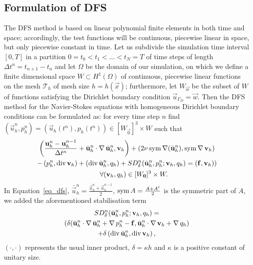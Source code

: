 \subsection{Formulation of DFS}
\label{sub_dfsFormulation}
The DFS method is based on linear polynomial finite elements in both time and space; accordingly, the test functions will be continuous, piecewise linear in space, but only piecewise constant in time.
Let us subdivide the simulation time interval \([0, T]\) in a partition \(0 = t_0 < t_1 < \dots < t_N = T\) of time steps of length \(\Delta t^n = t_{n+1} - t_n\) and let \(\Omega\) be the domain of our simulation, on which we define a finite dimensional space \(W \subset H^1(\Omega)\) of continuous, piecewise linear functions on the mesh \(\mathcal{T}_h\) of mesh size \(h = h(\vec{x})\); furthermore, let \(W_\vec{w}\) be the subset of \(W\) of functions satisfying the Dirichlet boundary condition \(\vec{u}_{\Gamma_D} = \vec{w}\).
Then the DFS method for the Navier-Stokes equations with homogeneous Dirichlet boundary conditions can be formulated as: for every time step \(n\) find \((\vec{u}_h^n, p_h^n) = (\vec{u}_h(t^n), p_h(t^n)) \in [W_\vec{0}]^3 \times W\) such that
\begin{multline}
  \left(\frac{\mathbf{u}_h^n - \mathbf{u}_h^{n-1}}{\Delta t^n} + \bar{\mathbf{u}}_h^n \cdot \operatorname{\nabla} \bar{\mathbf{u}}_h^n, \mathbf{v}_h\right)
    + \left( 2 \nu \operatorname{sym}\operatorname{\nabla}(\bar{\mathbf{u}}_h^n), \operatorname{sym}\operatorname{\nabla} \mathbf{v}_h \right) \\
    - \left( p_h^n, \operatorname{div} \mathbf{v}_h \right) 
    + \left( \operatorname{div} \bar{\mathbf{u}}_h^n, q_h \right) 
    + SD_\delta^n(\bar{\mathbf{u}}_h^n, p_h^n; \mathbf{v}_h, q_h)
    = \left( \mathbf{f}, \mathbf{v}_h) \right) \\
    \qquad \forall (\mathbf{v}_h, q_h) \in [W_\mathbf{0}]^3 \times W.
  \label{eq_dfs}
\end{multline}
In Equation~\eqref{eq_dfs}, \(\bar{\vec{u}}_h^n = \frac{\vec{u}_h^n + \vec{u}_h^{n-1}}{2}\), \(\operatorname{sym} A = \frac{A + A^t}{2}\) is the symmetric part of \(A\), we added the aforementioned stabilisation term
\begin{multline}
  SD_\delta^n(\bar{\mathbf{u}}_h^n, p_h^n; \mathbf{v}_h, q_h) = \\
  \left( \delta (\bar{\mathbf{u}}_h^n \cdot \operatorname{\nabla} \bar{\mathbf{u}}_h^n + \operatorname{\nabla} p_h^n - \mathbf{f}, \bar{\mathbf{u}}_h^n \cdot \operatorname{\nabla} \mathbf{v}_h + \operatorname{\nabla} q_h \right) \\
  + \delta\left(\operatorname{div} \bar{\mathbf{u}}_h^n, \operatorname{div} \mathbf{v}_h \right),
  \label{eq_stab}
\end{multline}
\(\left(\cdot, \cdot\right)\) represents the usual inner product, \(\delta = \kappa h\) and \(\kappa\) is a positive constant of unitary size.

